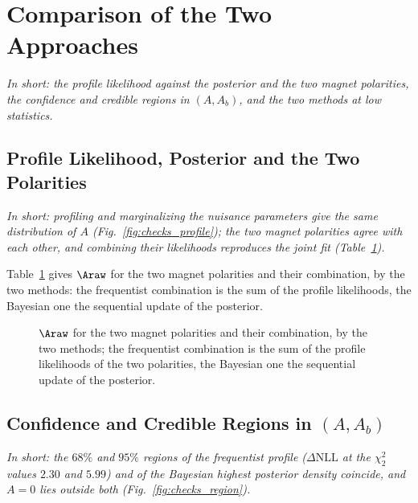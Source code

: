 \FloatBarrier

\section{Comparison of the Two Approaches}
\label{app:ext_comp}
\emph{In short: the profile likelihood against the posterior and the two magnet polarities, the confidence and credible regions in $(A,A_b)$, and the two methods at low statistics.}

\subsection{Profile Likelihood, Posterior and the Two Polarities}
\label{sec:checks_profile}
\emph{In short: profiling and marginalizing the nuisance parameters give the same distribution of $A$ (Fig.~\ref{fig:checks_profile}); the two magnet polarities agree with each other, and combining their likelihoods reproduces the joint fit (Table~\ref{tab:checks_polarity}).}

Table~\ref{tab:checks_polarity} gives $\Araw$ for the two magnet polarities and their combination, by the two methods: the frequentist combination is the sum of the profile likelihoods, the Bayesian one the sequential update of the posterior.

\begin{figure}[!t]
\makeatletter{}\makeatother
\centering
{}
\caption{$\Araw$ for the two magnet polarities and their combination, by the two methods; the frequentist combination is the sum of the profile likelihoods of the two polarities, the Bayesian one the sequential update of the posterior.}
\label{tab:checks_polarity}
\end{figure}

\subsection{Confidence and Credible Regions in $(A,A_b)$}
\label{sec:checks_region}
\emph{In short: the $68\%$ and $95\%$ regions of the frequentist profile ($\Delta\mathrm{NLL}$ at the $\chi^2_2$ values $2.30$ and $5.99$) and of the Bayesian highest posterior density coincide, and $A=0$ lies outside both (Fig.~\ref{fig:checks_region}).}

